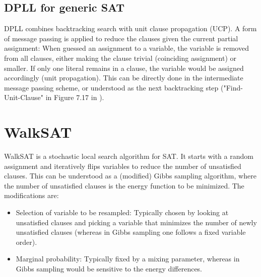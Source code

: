 \documentclass[aps,onecolumn,nofootinbib,pra]{article}
\begin{document}
    \subsection{DPLL for generic SAT}

    DPLL combines backtracking search with unit clause propagation (UCP).
    A form of message passing is applied to reduce the clauses given the current partial assignment:
    When guessed an assignment to a variable, the variable is removed from all clauses, either making the clause trivial (coinciding assignment) or smaller.
    If only one literal remains in a clause, the variable would be assigned accordingly (unit propagation).
    This can be directly done in the intermediate message passing scheme, or understood as the next backtracking step ("Find-Unit-Clause" in Figure 7.17 in \cite{russell_artificial_2021}).

    \section{WalkSAT}

    WalkSAT is a stochastic local search algorithm for SAT.
    It starts with a random assignment and iteratively flips variables to reduce the number of unsatisfied clauses.
    This can be understood as a (modified) Gibbs sampling algorithm, where the number of unsatisfied clauses is the energy function to be minimized.
    The modifications are:
    \begin{itemize}
        \item Selection of variable to be resampled: Typically chosen by looking at unsatisfied clauses and picking a variable that minimizes the number of newly unsatisfied clauses (whereas in Gibbs sampling one follows a fixed variable order).
        \item Marginal probability: Typically fixed by a mixing parameter, whereas in Gibbs sampling would be sensitive to the energy differences.
    \end{itemize}
\end{document}
